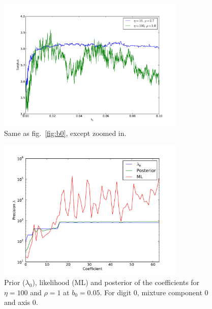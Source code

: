 \documentclass{report}
\begin{document}
\begin{figure}
    \centering
    \includegraphics[width=0.8\textwidth]{figs/surplus45.pdf}
    \caption{Same as fig.~\ref{fig:b0}, except zoomed in.} \label{fig:b0zoom}
\end{figure}


\begin{figure}
    \centering
    \includegraphics[width=0.8\textwidth]{figs/plotb000-eta100-rho1.pdf}
    \caption{Prior ($\lambda_0$), likelihood (ML) and posterior of the coefficients for $\eta=100$ and $\rho=1$ at $b_0 = 0.05$. For digit 0, mixture component 0 and axis 0.} \label{fig:rho1}
\end{figure}
\end{document}
